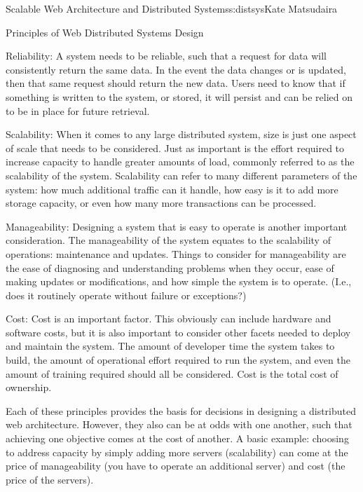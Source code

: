 \begin{aosachapter}{Scalable Web Architecture and Distributed Systems}{s:distsys}{Kate Matsudaira}
\begin{aosasect1}{Principles of Web Distributed Systems Design}
\begin{aosadescription}
\item{Reliability:} A system needs to be reliable, such that a request
  for data will consistently return the same data. In the event the
  data changes or is updated, then that same request should return the
  new data. Users need to know that if something is written to the
  system, or stored, it will persist and can be relied on to be in
  place for future retrieval.

\item{Scalability:} When it comes to any large distributed system, 
  size is just one aspect of scale that needs to be considered. Just as
  important is the effort required to increase capacity to handle
  greater amounts of load, commonly referred to as the
  scalability of the system. Scalability can refer to many different
  parameters of the system: how much additional traffic can it
  handle, how easy is it to add more storage capacity, or even how
  many more transactions can be processed.

\item{Manageability:} Designing a system that
  is easy to operate is another important consideration.  The manageability of
  the system equates to the scalability of operations: maintenance and
  updates. Things to consider for manageability are the ease of diagnosing and
  understanding problems when they occur, ease of making updates or
  modifications, and how simple the system is to operate. (I.e., does it
  routinely operate without failure or exceptions?)

\item{Cost:} Cost is an important factor. This obviously
  can include hardware and software costs, but it is also important to
  consider other facets needed to deploy and maintain the
  system. The amount of developer time the system takes to
  build, the amount of operational effort required to run the system,
  and even the amount of training required should all be
  considered. Cost is the total cost of ownership.

\end{aosadescription}

Each of these principles provides the basis for decisions 
in designing a distributed web architecture. However, they also can
be at odds with one another, such that achieving one objective comes
at the cost of another. A basic example: choosing to address
capacity by simply adding more servers (scalability) can come at the
price of manageability (you have to operate an additional server) and
cost (the price of the servers).


\end{aosasect1}
\end{aosachapter}
